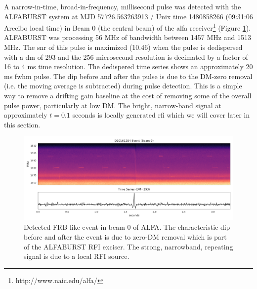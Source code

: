 \documentclass[a4paper,fleqn,usenatbib]{mnras}
\begin{document}
A narrow-in-time, broad-in-frequency, millisecond pulse was detected with the
ALFABURST system at MJD 57726.563263913 / Unix time 1480858266 (09:31:06 Arecibo
local time) in Beam 0 (the central beam) of the \gls{alfa}
receiver\footnote{http://www.naic.edu/alfa/} (Figure
\ref{fig:beam0_dynamic_spec_wide}). ALFABURST was processing 56 MHz of bandwidth
between 1457 MHz and 1513 MHz. The \gls{snr} of this pulse is maximized (10.46)
when the pulse is dedispersed with a \gls{dm} of 293 and the 256 microsecond
resolution is decimated by a factor of 16 to 4 ms time resolution. The
dedispered time series shows an approximately 20 ms \gls{fwhm} pulse. The dip
before and after the pulse is due to the DM-zero removal (i.e. the moving
average is subtracted) during pulse detection. This is a simple way to remove a
drifting gain baseline at the cost of removing some of the overall pulse power,
particularly at low DM. The bright, narrow-band signal at approximately $t=0.1$
seconds is locally generated \gls{rfi} which we will cover later in this
section.

\begin{figure}
    \includegraphics[width=1.0\linewidth]{figures/D20161204_buf23_Beam0_wide.pdf}
    \caption{Detected FRB-like event in beam 0 of ALFA. The characteristic dip
    before and after the event is due to zero-DM removal which is part of the
    ALFABURST RFI exciser. The strong, narrowband, repeating signal is due to a
    local RFI source.
    }
    \label{fig:beam0_dynamic_spec_wide}
\end{figure}
\end{document}
